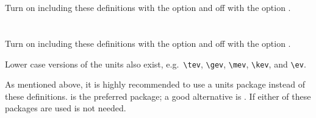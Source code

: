 \newpage
\onecolumn
\section{}

Turn on including these definitions with the option  and off with the option .


\twocolumn


\newpage
\section{}

Turn on including these definitions with the option  and off with the option .



\noindent Lower case versions of the units also exist, e.g.\ \verb|\tev|, \verb|\gev|, \verb|\mev|, \verb|\kev|, and
\verb|\ev|.

As mentioned above, it is highly recommended to use a units package instead of
these definitions.  is the preferred package; a good alternative is .
If either of these packages are used  is not needed.

